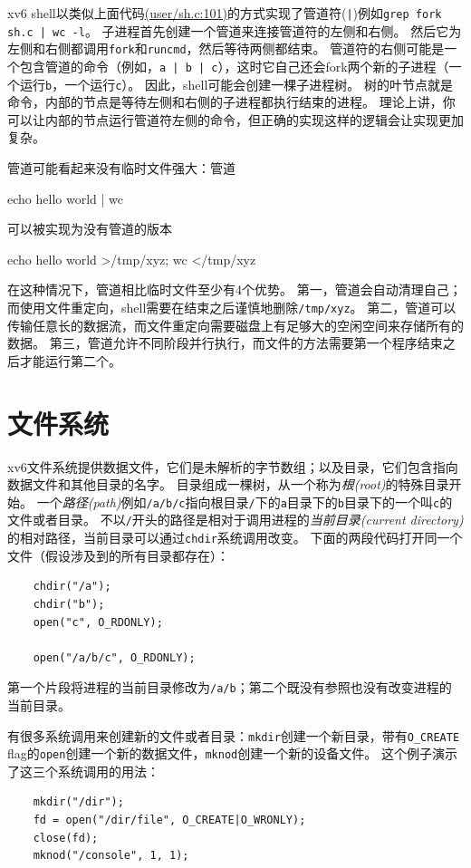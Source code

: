 xv6 shell以类似上面代码\href{https://github.com/mit-pdos/xv6-riscv/blob/riscv//user/sh.c#L101}{(user/sh.c:101)}的方式实现了管道符(\texttt{|})例如\texttt{grep fork sh.c | wc -l}。
子进程首先创建一个管道来连接管道符的左侧和右侧。
然后它为左侧和右侧都调用\texttt{fork}和\texttt{runcmd}，然后等待两侧都结束。
管道符的右侧可能是一个包含管道的命令（例如，\texttt{a | b | c}），这时它自己还会fork两个新的子进程（一个运行\texttt{b}，一个运行\texttt{c}）。
因此，shell可能会创建一棵子进程树。
树的叶节点就是命令，内部的节点是等待左侧和右侧的子进程都执行结束的进程。
理论上讲，你可以让内部的节点运行管道符左侧的命令，但正确的实现这样的逻辑会让实现更加复杂。

管道可能看起来没有临时文件强大：管道
\begin{blacklisting}
    echo hello world | wc    
\end{blacklisting}
可以被实现为没有管道的版本
\begin{blacklisting}
    echo hello world >/tmp/xyz; wc </tmp/xyz
\end{blacklisting}

在这种情况下，管道相比临时文件至少有4个优势。
第一，管道会自动清理自己；而使用文件重定向，shell需要在结束之后谨慎地删除\texttt{/tmp/xyz}。
第二，管道可以传输任意长的数据流，而文件重定向需要磁盘上有足够大的空闲空间来存储所有的数据。
第三，管道允许不同阶段并行执行，而文件的方法需要第一个程序结束之后才能运行第二个。

\section{文件系统}
xv6文件系统提供数据文件，它们是未解析的字节数组；以及目录，它们包含指向数据文件和其他目录的名字。
目录组成一棵树，从一个称为\emph{根(root)}的特殊目录开始。
一个\emph{路径(path)}例如\texttt{/a/b/c}指向根目录\texttt{/}下的\texttt{a}目录下的\texttt{b}目录下的一个叫\texttt{c}的文件或者目录。
不以\texttt{/}开头的路径是相对于调用进程的\emph{当前目录(current directory)}的相对路径，当前目录可以通过\texttt{chdir}系统调用改变。
下面的两段代码打开同一个文件（假设涉及到的所有目录都存在）：
\begin{lstlisting}
    chdir("/a");
    chdir("b");
    open("c", O_RDONLY);

    open("/a/b/c", O_RDONLY);
\end{lstlisting}
第一个片段将进程的当前目录修改为\texttt{/a/b}；第二个既没有参照也没有改变进程的当前目录。

有很多系统调用来创建新的文件或者目录：\texttt{mkdir}创建一个新目录，带有\texttt{O\_CREATE} flag的\texttt{open}创建一个新的数据文件，\texttt{mknod}创建一个新的设备文件。
这个例子演示了这三个系统调用的用法：
\begin{lstlisting}
    mkdir("/dir");
    fd = open("/dir/file", O_CREATE|O_WRONLY);
    close(fd);
    mknod("/console", 1, 1);
\end{lstlisting}

